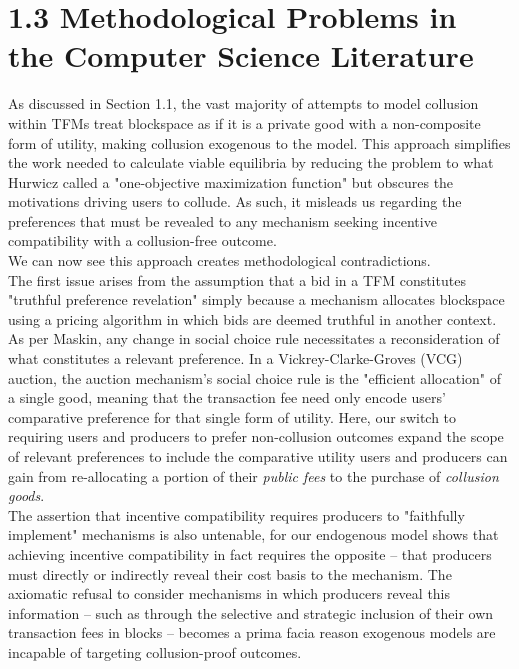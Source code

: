 \documentclass[11pt,a4paper]{llncs}
\begin{document}
\section*{1.3 Methodological Problems in the Computer Science Literature}

As discussed in Section 1.1, the vast majority of attempts to model collusion within TFMs treat blockspace as if it is a private good with a non-composite form of utility, making collusion exogenous to the model. This approach simplifies the work needed to calculate viable equilibria by reducing the problem to what Hurwicz called a "one-objective maximization function" but obscures the motivations driving users to collude. As such, it misleads us regarding the preferences that must be revealed to any mechanism seeking incentive compatibility with a collusion-free outcome.
\vspace{0.2cm} \\
We can now see this approach creates methodological contradictions.
\vspace{0.2cm} \\
The first issue arises from the assumption that a bid in a TFM constitutes "truthful preference revelation" simply because a mechanism allocates blockspace using a pricing algorithm in which bids are deemed truthful in another context. As per Maskin, any change in social choice rule necessitates a reconsideration of what constitutes a relevant preference. In a Vickrey-Clarke-Groves (VCG) auction, the auction mechanism's social choice rule is the "efficient allocation" of a single good, meaning that the transaction fee need only encode users' comparative preference for that single form of utility. Here, our switch to requiring users and producers to prefer non-collusion outcomes expand the scope of relevant preferences to include the comparative utility users and producers can gain from re-allocating a portion of their \textit{public fees} to the purchase of \textit{collusion goods}.
\vspace{0.2cm} \\
The assertion that incentive compatibility requires producers to "faithfully implement" mechanisms is also untenable, for our endogenous model shows that achieving incentive compatibility in fact requires the opposite -- that producers must directly or indirectly reveal their cost basis to the mechanism. The axiomatic refusal to consider mechanisms in which producers reveal this information -- such as through the selective and strategic inclusion of their own transaction fees in blocks -- becomes a prima facia reason exogenous models are incapable of targeting collusion-proof outcomes.
\end{document}

